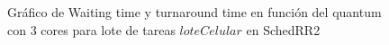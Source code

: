 \begin{figure}[H]
\hfill
{}
\hfill
{}
\hfill
\caption{Gráfico de Waiting time y turnaround time en función del quantum con 3 cores para lote de tareas $loteCelular$ en SchedRR2}
\end{figure}

